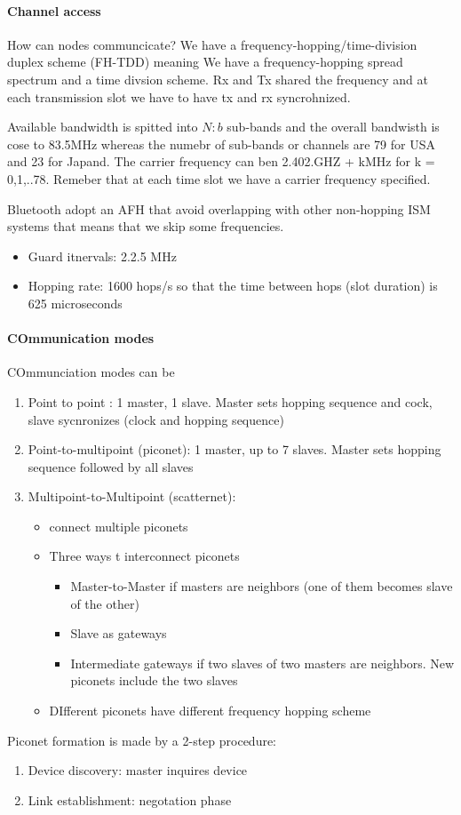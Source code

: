 \paragraph{Channel access}
How can nodes communcicate? We have a frequency-hopping/time-division duplex scheme (FH-TDD) meaning We have a frequency-hopping spread spectrum and a time divsion scheme. Rx and Tx shared the frequency and at each transmission slot we have to have tx and rx syncrohnized.

Available bandwidth is spitted into $N:b$ sub-bands and the overall bandwisth is cose to 83.5MHz whereas the numebr of sub-bands or channels are 79 for USA and 23 for Japand.
The carrier frequency can ben 2.402.GHZ + kMHz for k = 0,1,..78. Remeber that at each time slot we have a carrier frequency specified.

Bluetooth adopt an AFH that avoid overlapping with other non-hopping ISM systems that means that we skip some frequencies.
\begin{itemize}
\item Guard itnervals: 2.2.5 MHz
\item Hopping rate: 1600 hops/s so that the time between hops (slot duration) is 625 microseconds
\end{itemize}

\paragraph{COmmunication modes}
COmmunciation modes can be
\begin{enumerate}
\item Point to point
: 1 master, 1 slave. Master sets hopping sequence and cock, slave sycnronizes (clock and hopping sequence)
\item Point-to-multipoint (piconet): 1 master, up to 7 slaves. Master sets hopping sequence followed by all slaves
\item Multipoint-to-Multipoint (scatternet):
\begin{itemize}
\item connect multiple piconets
\item Three ways t interconnect piconets
\begin{itemize}
\item Master-to-Master if masters are neighbors (one of them becomes slave of the other)
\item Slave as gateways
\item Intermediate gateways if two slaves of two masters are neighbors. New piconets include the two slaves
\end{itemize}
\item DIfferent piconets have different frequency hopping scheme
\end{itemize}
\end{enumerate}
Piconet formation is made by a 2-step procedure:
\begin{enumerate}
\item Device discovery: master inquires device
\item Link establishment: negotation phase
\end{enumerate}

